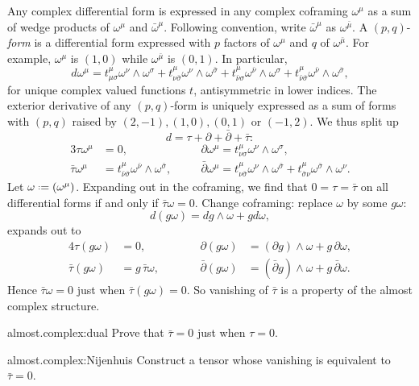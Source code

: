 Any complex differential form is expressed in any complex coframing \(\omega^{\mu}\) as a sum of wedge products of \(\omega^{\mu}\) and \(\bar\omega^{\mu}\). Following convention, write \(\bar\omega^{\mu}\) as \(\omega^{\bar{\mu}}\).
A \((p,q)\)-\emph{form} is a differential form expressed with \(p\) factors of \(\omega^{\mu}\) and \(q\) of \(\omega^{\bar{\mu}}\).
For example, \(\omega^{\mu}\) is \((1,0)\) while \(\omega^{\bar{\mu}}\) is \((0,1)\).
In particular,
\[
d\omega^{\mu}=%
t^{\mu}_{\mu\sigma}\omega^{\nu}\wedge\omega^{\sigma}+
t^{\mu}_{\nu\bar\sigma}\omega^{\nu}\wedge\omega^{\bar\sigma}+
t^{\mu}_{\bar\nu\sigma}\omega^{\bar\nu}\wedge\omega^{\sigma}+
t^{\mu}_{\bar\nu\bar\sigma}\omega^{\bar\nu}\wedge\omega^{\bar\sigma},
\]
for unique complex valued functions \(t\), antisymmetric in lower indices.
The exterior derivative of any \((p,q)\)-form is uniquely expressed as a sum of forms with \((p,q)\) raised by \((2,-1),(1,0),(0,1)\) or \((-1,2)\).
We thus split up
\[
d=\tau+\partial+\bar\partial+\bar\tau:
\]
\begin{alignat*}{3} 
\tau\omega^{\mu}
&=0,
\quad&&
\partial\omega^{\mu}
=t^{\mu}_{\nu\sigma}\omega^{\nu}\wedge\omega^{\sigma},\\
\bar\tau\omega^{\mu}
&=t^{\mu}_{\bar\nu\bar\sigma}\omega^{\bar\nu}\wedge\omega^{\bar\sigma},
\quad&&
\bar\partial\omega^{\mu}
=t^{\mu}_{\nu\bar\sigma}\omega^{\nu}\wedge\omega^{\bar\sigma}+
t^{\mu}_{\bar\sigma\nu}\omega^{\bar\sigma}\wedge\omega^{\nu}.
\end{alignat*}
Let \(\omega\defeq(\omega^{\mu})\).
Expanding out in the coframing, we find that \(0=\tau=\bar\tau\) on all differential forms if and only if \(\bar\tau\omega=0\).
Change coframing:  replace \(\omega\) by some \(g\omega\):
\[
d(g\omega)=dg\wedge\omega+gd\omega,
\]
expands out to
\begin{alignat*} {4}
\tau(g\omega)&=0,\qquad&&\partial(g\omega)&=(\partial g)\wedge\omega+g \, \partial\omega,\\
\bar\tau(g\omega)&=g\,\bar\tau\omega,\qquad&&\bar\partial(g\omega)&=(\bar\partial g)\wedge\omega+g \, \bar\partial\omega.
\end{alignat*}
Hence \(\bar\tau\omega=0\) just when \(\bar\tau(g\omega)=0\).
So vanishing of \(\bar\tau\) is a property of the almost complex structure.
\begin{problem}{almost.complex:dual}
Prove that \(\bar\tau=0\) just when \(\tau=0\).
\end{problem}
\begin{problem}{almost.complex:Nijenhuis}
Construct a tensor whose vanishing is equivalent to \(\bar\tau=0\).
\end{problem}
